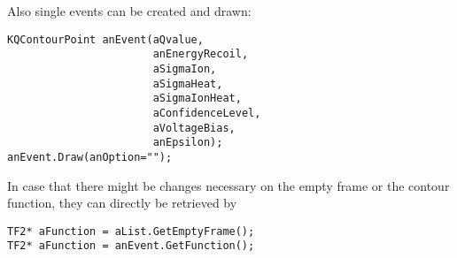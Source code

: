 \documentclass[10pt, a4paper]{article}
\begin{document}
Also single events can be created and drawn:
\begin{verbatim}
KQContourPoint anEvent(aQvalue,
                       anEnergyRecoil,
                       aSigmaIon,
                       aSigmaHeat,
                       aSigmaIonHeat,
                       aConfidenceLevel,
                       aVoltageBias,
                       anEpsilon);
anEvent.Draw(anOption="");
\end{verbatim}
In case that there might be changes necessary on the empty frame or the contour function, they can directly be retrieved by
\begin{verbatim}
TF2* aFunction = aList.GetEmptyFrame();
TF2* aFunction = anEvent.GetFunction();
\end{verbatim}











 
\end{document}
